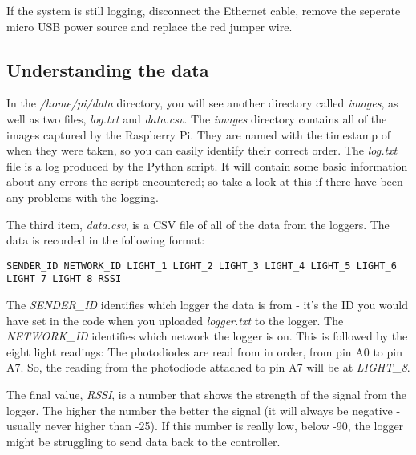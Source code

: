 \documentclass[10pt]{article}
\begin{document}
If the system is still logging, disconnect the Ethernet cable, remove the seperate micro USB power source and replace the red jumper wire. 

\subsection{Understanding the data}

In the \textit{/home/pi/data} directory, you will see another directory called \textit{images}, as well as two files, \textit{log.txt} and \textit{data.csv}. The \textit{images} directory contains all of the images captured by the Raspberry Pi. They are named with the timestamp of when they were taken, so you can easily identify their correct order. The \textit{log.txt} file is a log produced by the Python script. It will contain some basic information about any errors the script encountered; so take a look at this if there have been any problems with the logging. 

The third item, \textit{data.csv}, is a CSV file of all of the data from the loggers. The data is recorded in the following format: 

\begin{verbatim}
SENDER_ID NETWORK_ID LIGHT_1 LIGHT_2 LIGHT_3 LIGHT_4 LIGHT_5 LIGHT_6 LIGHT_7 LIGHT_8 RSSI
\end{verbatim}

The \textit{SENDER\_ID} identifies which logger the data is from - it's the ID you would have set in the code when you uploaded \textit{logger.txt} to the logger. The \textit{NETWORK\_ID} identifies which network the logger is on. This is followed by the eight light readings: The photodiodes are read from in order, from pin A0 to pin A7. So, the reading from the photodiode attached to pin A7 will be at \textit{LIGHT\_8}. 

The final value, \textit{RSSI}, is a number that shows the strength of the signal from the logger. The higher the number the better the signal (it will always be negative - usually never higher than -25). If this number is really low, below -90, the logger might be struggling to send data back to the controller.
\end{document}

